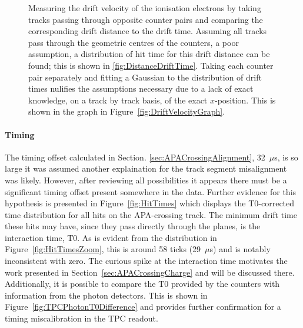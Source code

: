 \begin{figure}
  \caption[Measuring the drift velocity of the ionisation electrons by taking tracks passing through opposite counter pairs and comparing the corresponding drift distance to the drift time.]{Measuring the drift velocity of the ionisation electrons by taking tracks passing through opposite counter pairs and comparing the corresponding drift distance to the drift time.  Assuming all tracks pass through the geometric centres of the counters, a poor assumption, a distribution of hit time for this drift distance can be found; this is shown in \ref{fig:DistanceDriftTime}.  Taking each counter pair separately and fitting a Gaussian to the distribution of drift times nulifies the assumptions necessary due to a lack of exact knowledge, on a track by track basis, of the exact $x$-position.  This is shown in the graph in Figure~\ref{fig:DriftVelocityGraph}.}
  \label{fig:DriftVelocity}
\end{figure}

\paragraph{Timing}

The timing offset calculated in Section. \ref{sec:APACrossingAlignment}, 32~$\mu$s, is so large it was assumed another explaination for the track segment misalignment was likely.  However, after reviewing all possibilities it appears there must be a significant timing offset present somewhere in the data.  Further evidence for this hypothesis is presented in Figure~\ref{fig:HitTimes} which displays the T0-corrected time distribution for all hits on the APA-crossing track.  The minimum drift time these hits may have, since they pass directly through the planes, is the interaction time, T0.  As is evident from the distribution in Figure~\ref{fig:HitTimesZoom}, this is around 58 ticks (29~$\mu$s) and is notably inconsistent with zero.  The curious spike at the interaction time motivates the work presented in Section~\ref{sec:APACrossingCharge} and will be discussed there.  Additionally, it is possible to compare the T0 provided by the counters with information from the photon detectors.  This is shown in Figure~\ref{fig:TPCPhotonT0Difference} and provides further confirmation for a timing miscalibration in the TPC readout.


